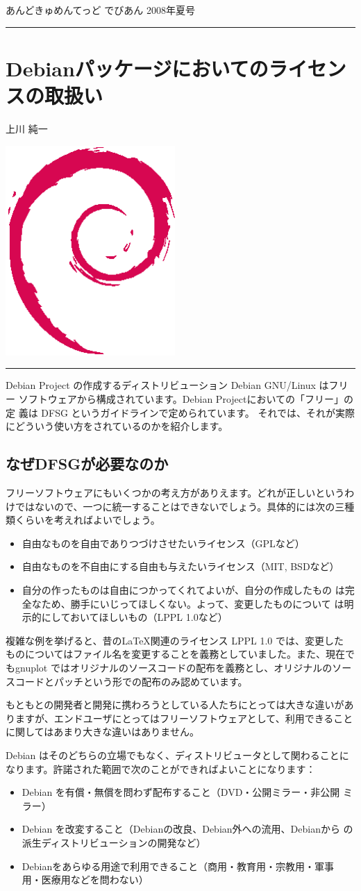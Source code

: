 \documentclass[mingoth,a4paper]{jsarticle}
\renewcommand{\dancersection}[2]{%
\newpage
あんどきゅめんてっど でびあん 2008年夏号
%
\vspace{0.1mm}\\
{\color{dancerlightblue}\rule{\hsize}{2mm}}

%
%
\begin{minipage}[t]{0.6\hsize}
\color{dancerdarkblue}
\vspace{1cm}
\section{#1}
\hfill{}#2\\
\end{minipage}
\begin{minipage}[t]{0.4\hsize}
\vspace{-2cm}
\hfill{}\includegraphics[height=8cm]{image200502/openlogo-nd.eps}\\
\vspace{-5cm}
\end{minipage}
%
%
{\color{dancerdarkblue}\rule{0.74\hsize}{2mm}}
%
\vspace{2cm}
}
\begin{document}

\dancersection{Debianパッケージにおいてのライセンスの取扱い}{上川 純一}
\label{sec:license}

Debian Project の作成するディストリビューション Debian GNU/Linux はフリー
ソフトウェアから構成されています。Debian Projectにおいての「フリー」の定
義は DFSG というガイドラインで定められています。
それでは、それが実際にどういう使い方をされているのかを紹介します。

\subsection{なぜDFSGが必要なのか}

フリーソフトウェアにもいくつかの考え方がありえます。どれが正しいというわ
けではないので、一つに統一することはできないでしょう。具体的には次の三種
類くらいを考えればよいでしょう。

\begin{itemize}
 \item 自由なものを自由でありつづけさせたいライセンス（GPLなど）
 \item 自由なものを不自由にする自由も与えたいライセンス（MIT, BSDなど）
 \item 自分の作ったものは自由につかってくれてよいが、自分の作成したもの
       は完全なため、勝手にいじってほしくない。よって、変更したものについて
       は明示的にしておいてほしいもの（LPPL 1.0など）
\end{itemize}

複雑な例を挙げると、昔の\LaTeX{}関連のライセンス LPPL 1.0 では、変更した
ものについてはファイル名を変更することを義務としていました。また、現在で
もgnuplot ではオリジナルのソースコードの配布を義務とし、オリジナルのソー
スコードとパッチという形での配布のみ認めています。

もともとの開発者と開発に携わろうとしている人たちにとっては大きな違いがあ
りますが、エンドユーザにとってはフリーソフトウェアとして、利用できること
に関してはあまり大きな違いはありません。

Debian はそのどちらの立場でもなく、ディストリビュータとして関わることに
なります。許諾された範囲で次のことができればよいことになります：

\begin{itemize}
 \item Debian を有償・無償を問わず配布すること（DVD・公開ミラー・非公開
       ミラー）
 \item Debian を改変すること（Debianの改良、Debian外への流用、Debianから
       の派生ディストリビューションの開発など）
 \item Debianをあらゆる用途で利用できること（商用・教育用・宗教用・軍事
       用・医療用などを問わない）
\end{itemize}
\end{document}
